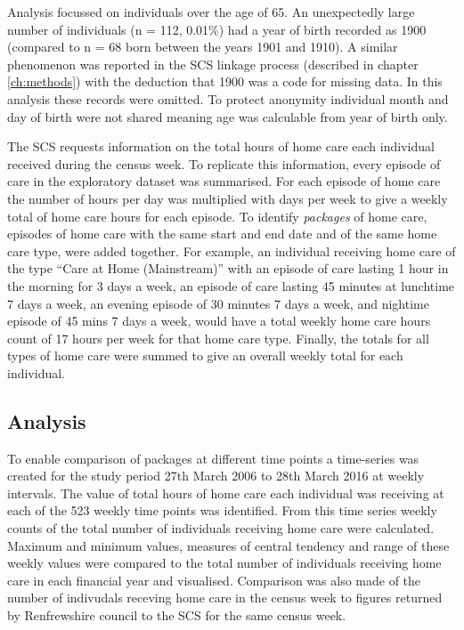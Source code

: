 \documentclass[]{article}
\begin{document}
Analysis focussed on individuals over the age of 65. An unexpectedly
large number of individuals (n = 112, 0.01\%) had a year of birth
recorded as 1900 (compared to n = 68 born between the years 1901 and
1910). A similar phenomenon was reported in the SCS linkage process
(described in chapter \ref{ch:methods}) with the deduction that 1900 was
a code for missing data. In this analysis these records were omitted. To
protect anonymity individual month and day of birth were not shared
meaning age was calculable from year of birth only.

The SCS requests information on the total hours of home care each
individual received during the census week. To replicate this
information, every episode of care in the exploratory dataset was
summarised. For each episode of home care the number of hours per day
was multiplied with days per week to give a weekly total of home care
hours for each episode. To identify \emph{packages} of home care,
episodes of home care with the same start and end date and of the same
home care type, were added together. For example, an individual
receiving home care of the type ``Care at Home (Mainstream)'' with an
episode of care lasting 1 hour in the morning for 3 days a week, an
episode of care lasting 45 minutes at lunchtime 7 days a week, an
evening episode of 30 minutes 7 days a week, and nightime episode of 45
mins 7 days a week, would have a total weekly home care hours count of
17 hours per week for that home care type. Finally, the totals for all
types of home care were summed to give an overall weekly total for each
individual.

\subsection{Analysis}\label{subsec:renf-methods-analysis}

To enable comparison of packages at different time points a time-series
was created for the study period 27th March 2006 to 28th March 2016 at
weekly intervals. The value of total hours of home care each individual
was receiving at each of the 523 weekly time points was identified. From
this time series weekly counts of the total number of individuals
receiving home care were calculated. Maximum and minimum values,
measures of central tendency and range of these weekly values were
compared to the total number of individuals receiving home care in each
financial year and visualised. Comparison was also made of the number of
indivudals receving home care in the census week to figures returned by
Renfrewshire council to the SCS for the same census week.
\end{document}
